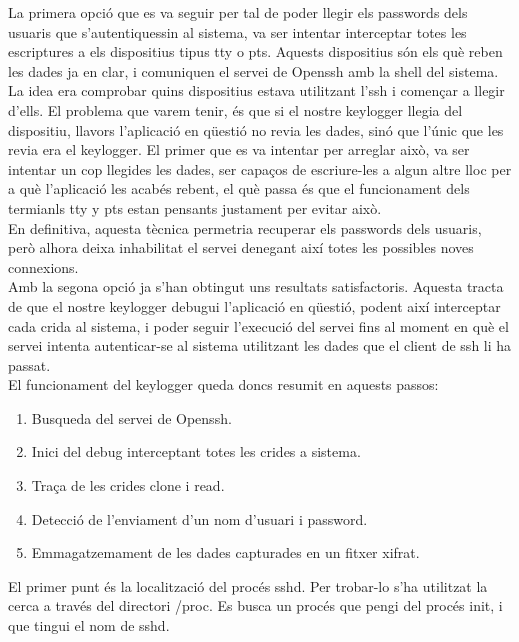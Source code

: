La primera opció que es va seguir per tal de poder llegir els passwords dels usuaris que s'autentiquessin al sistema, va ser intentar 
interceptar totes les escriptures a els dispositius tipus tty o pts. Aquests dispositius són els què reben 
les dades ja en clar, i comuniquen el servei de Openssh amb la shell del sistema. \\
La idea era comprobar quins dispositius estava utilitzant l'ssh i començar a llegir d'ells. El problema que
varem tenir, és que si el nostre keylogger llegia del dispositiu, llavors l'aplicació en qüestió no revia les
dades, sinó que l'únic que les revia era el keylogger. El primer que es va intentar per arreglar això,
va ser intentar un cop llegides les dades, ser capaços de escriure-les a algun altre lloc per a què
l'aplicació les acabés rebent, el què passa és que el funcionament dels termianls tty y pts estan pensants
justament per evitar això.\\

En definitiva, aquesta tècnica permetria recuperar els passwords dels usuaris, però alhora deixa inhabilitat el servei denegant així 
totes les possibles noves connexions. \\

Amb la segona opció ja s'han obtingut uns resultats satisfactoris. Aquesta tracta de que el nostre keylogger debugui l'aplicació
en qüestió, podent així interceptar cada crida al sistema, i poder seguir l'execució del servei fins al moment
en què el servei intenta autenticar-se al sistema utilitzant les dades que el client de ssh li ha passat. \\

El funcionament del keylogger queda doncs resumit en aquests passos:
\begin{enumerate}
\item Busqueda del servei de Openssh.
\item Inici del debug interceptant totes les crides a sistema.
\item Traça de les crides clone i read.
\item Detecció de l'enviament d'un nom d'usuari i password.
\item Emmagatzemament de les dades capturades en un fitxer xifrat.
\end{enumerate}

El primer punt és la localització del procés sshd. Per trobar-lo s'ha utilitzat la cerca a través del
directori /proc. Es busca un procés que pengi del procés init, i que tingui el nom de sshd. \\

